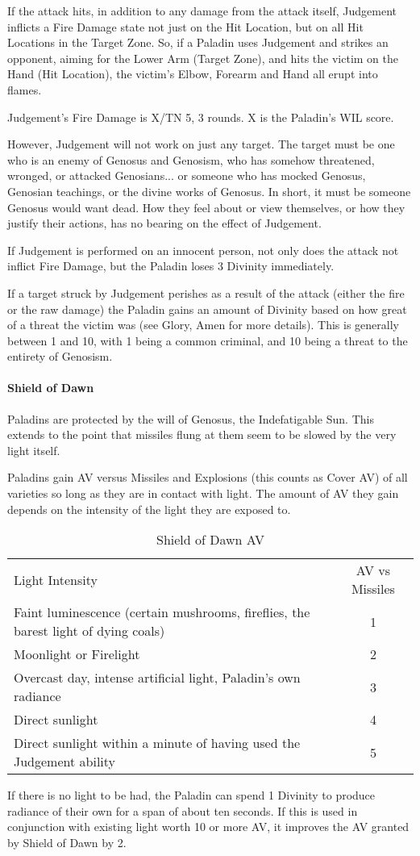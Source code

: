 \documentclass[oneside,11pt,english]{book}
\begin{document}
If the attack hits, in addition to any damage from the attack itself, Judgement inflicts a Fire Damage state not just on the Hit Location, but on all Hit Locations in the Target Zone. So, if a Paladin uses Judgement and strikes an opponent, aiming for the Lower Arm (Target Zone), and hits the victim on the Hand (Hit Location), the victim's Elbow, Forearm and Hand all erupt into flames.


Judgement's Fire Damage is X/TN 5, 3 rounds. X is the Paladin's WIL score.


However, Judgement will not work on just any target. The target must be one who is an enemy of 
Genosus and Genosism, who has somehow threatened, wronged, or attacked Genosians... or 
someone who has mocked Genosus, Genosian teachings, or the divine works of Genosus. In 
short, it must be someone Genosus would want dead. How they feel about or view themselves, or 
how they justify their actions, has no bearing on the effect of Judgement. 


If Judgement is performed on an innocent person, not only does the attack not inflict Fire 
Damage, but the Paladin loses 3 Divinity immediately. 


If a target struck by Judgement perishes as a result of the attack (either the fire or the raw 
damage) the Paladin gains an amount of Divinity based on how great of a threat the victim was 
(see Glory, Amen for more details). This is generally between 1 and 10, with 1 being a common 
criminal, and 10 being a threat to the entirety of Genosism. 
\paragraph{Shield of Dawn}
Paladins are protected by the will of Genosus, the Indefatigable Sun. This extends to the point 
that missiles flung at them seem to be slowed by the very light itself.


Paladins gain AV versus Missiles and Explosions (this counts as Cover AV) of all varieties so 
long as they are in contact with light. The amount of AV they gain depends on the intensity of the 
light they are exposed to.\par
\begin{table}[!ht]
	\caption{Shield of Dawn AV}
	\label{tab:Shield of Dawn AV}
	\begin{tabu} spread 0pt {Xc}
		Light Intensity& AV vs Missiles\\
		Faint luminescence (certain mushrooms, fireflies, the barest light of dying coals)& 1\\
		Moonlight or Firelight &2\\
		Overcast day, intense artificial light, Paladin's own radiance& 3\\
		Direct sunlight& 4\\
		Direct sunlight within a minute of having used the Judgement ability& 5\\
	\end{tabu}
\end{table}
If there is no light to be had, the Paladin can spend 1 Divinity to produce radiance of their own 
for a span of about ten seconds. If this is used in conjunction with existing light worth 10 or more 
AV, it improves the AV granted by Shield of Dawn by 2. 
\end{document}
